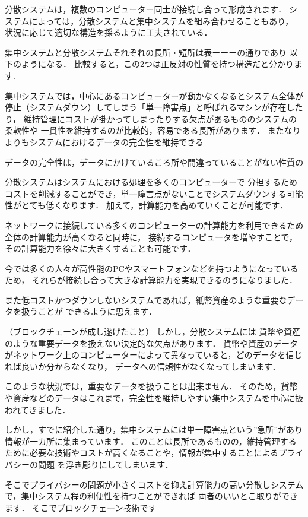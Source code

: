 \documentclass[a4paper,12pt]{jsarticle}
\begin{document}
分散システムは，複数のコンピューター同士が接続し合って形成されます．
システムによっては，分散システムと集中システムを組み合わせることもあり，
状況に応じて適切な構造を採るように工夫されている．

集中システムと分散システムそれぞれの長所・短所は表ーーーの通りであり
以下のようになる．
比較すると，この2つは正反対の性質を持つ構造だと分かります.

集中システムでは，中心にあるコンピューターが動かなくなるとシステム全体が
停止（システムダウン）してしまう「単一障害点」と呼ばれるマシンが存在したり，
維持管理にコストが掛かってしまったりする欠点があるもののシステムの柔軟性や
一貫性を維持するのが比較的，容易である長所があります．
またなりよりもシステムにおけるデータの完全性を維持できる

データの完全性は，データにかけているころ所や間違っていることがない性質の

分散システムはシステムにおける処理を多くのコンピューターで
分担するためコストを削減することができ，単一障害点がないことでシステムダウンする可能性がとても低くなります．
加えて，計算能力を高めていくことが可能です．

ネットワークに接続している多くのコンピューターの計算能力を利用できるため全体の計算能力が高くなると同時に，
接続するコンピュータを増やすことで，その計算能力を徐々に大きくすることも可能です．

今では多くの人々が高性能のPCやスマートフォンなどを持つようになっているため，
それらが接続し合って大きな計算能力を実現できるのうになりました．

また低コストかつダウンしないシステムであれば，紙幣資産のような重要なデータを扱うことが
できるように思えます．

（ブロックチェーンが成し遂げたこと）
しかし，分散システムには
貨幣や資産のような重要データを扱えない決定的な欠点があります．
貨幣や資産のデータがネットワーク上のコンピューターによって異なっていると，どのデータを信じれば良いか分からなくなり，
データへの信頼性がなくなってしまいます．

このような状況では，重要なデータを扱うことは出来ません．
そのため，貨幣や資産などのデータはこれまで，完全性を維持しやすい集中システムを中心に扱われてきました．

しかし，すでに紹介した通り，集中システムには単一障害点という”急所”があり情報が一カ所に集まっています．
このことは長所であるものの，維持管理するために必要な技術やコストが高くなることや，情報が集中することによるプライバシーの問題
を浮き彫りにしてしまいます．

そこでプライバシーの問題が小さくコストを抑え計算能力の高い分散しシステムで，集中システム程の利便性を持つことができれば
両者のいいとこ取りができます．
そこでブロックチェーン技術です
\end{document}
